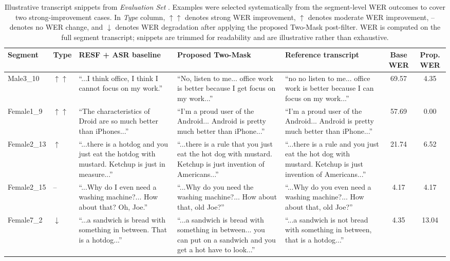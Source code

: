\documentclass[manuscript,screen,review]{acmart}
\newcommand{\RomanNumeralCaps}[1]
    {\MakeUppercase{\romannumeral #1}}
\begin{document}
\begin{table}[th]
    \centering
    \scriptsize
    \caption{Illustrative transcript snippets from \textit{Evaluation Set \RomanNumeralCaps{3}}. Examples were selected systematically from the segment-level WER outcomes to cover two strong-improvement cases. In \textit{Type} column, $\uparrow\uparrow$ denotes strong WER improvement, $\uparrow$ denotes moderate WER improvement, -- denotes no WER change, and $\downarrow$ denotes WER degradation after applying the proposed Two-Mask post-filter. WER is computed on the full segment transcript; snippets are trimmed for readability and are illustrative rather than exhaustive.}
    
    \begin{tabular}{p{0.8cm}p{0.8cm}p{3.1cm}p{3.1cm}p{3.1cm}cc}
    \hline
    Segment & Type & RESF + ASR baseline & Proposed Two-Mask & Reference transcript & Base WER & Prop. WER \\ \hline
    Male3\_10 & $\uparrow\uparrow$ & ``...I think office, I think I cannot focus on my work.'' & ``No, listen to me... office work is better because I get focus on my work...'' & ``no no listen to me... office work is better because I can focus on my work...'' & 69.57 & 4.35 \\
    Female1\_9 & $\uparrow\uparrow$ & ``The characteristics of Droid are so much better than iPhones...'' & ``I'm a proud user of the Android... Android is pretty much better than iPhone...'' & ``I'm a proud user of the Android... Android is pretty much better than iPhone...'' & 57.69 & 0.00 \\
    Female2\_13 & $\uparrow$ & ``...there is a hotdog and you just eat the hotdog with mustard. Ketchup is just in measure...'' & ``...there is a rule that you just eat the hot dog with mustard. Ketchup is just invention of Americans...'' & ``...there is a rule and you just eat the hot dog with mustard. Ketchup is just invention of Americans...'' & 21.74 & 6.52 \\
    Female2\_15 & -- & ``...Why do I even need a washing machine?... How about that? Oh, Joe.'' & ``...Why do you need the washing machine?... How about that, old Joe?'' & ``...Why do you even need a washing machine?... How about that, old Joe?'' & 4.17 & 4.17 \\
    Female7\_2 & $\downarrow$ & ``...a sandwich is bread with something in between. That is a hotdog...'' & ``...a sandwich is bread with something in between... you can put on a sandwich and you get a hot have to look...'' & ``...a sandwich is not bread with something in between, that is a hotdog...'' & 4.35 & 13.04 \\ \hline
    \end{tabular}
    \label{tab:set3_examples}
\end{table}
\end{document}
